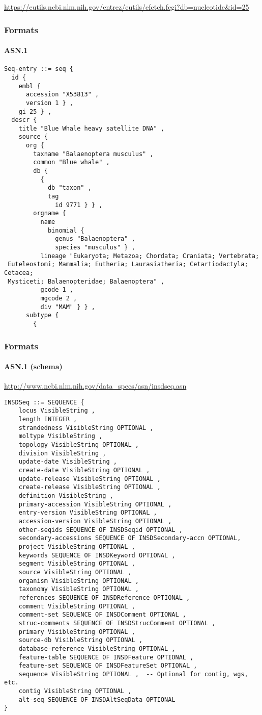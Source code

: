 \documentclass{beamer}
\begin{document}
\begin{frame}[fragile]
\url{https://eutils.ncbi.nlm.nih.gov/entrez/eutils/efetch.fcgi?db=nucleotide&id=25}
\frametitle{Formats}
\framesubtitle{ASN.1}
\begin{lstlisting}[basicstyle=\tiny,breaklines=false]
Seq-entry ::= seq {
  id {
    embl {
      accession "X53813" ,
      version 1 } ,
    gi 25 } ,
  descr {
    title "Blue Whale heavy satellite DNA" ,
    source {
      org {
        taxname "Balaenoptera musculus" ,
        common "Blue whale" ,
        db {
          {
            db "taxon" ,
            tag
              id 9771 } } ,
        orgname {
          name
            binomial {
              genus "Balaenoptera" ,
              species "musculus" } ,
          lineage "Eukaryota; Metazoa; Chordata; Craniata; Vertebrata;
 Euteleostomi; Mammalia; Eutheria; Laurasiatheria; Cetartiodactyla; Cetacea;
 Mysticeti; Balaenopteridae; Balaenoptera" ,
          gcode 1 ,
          mgcode 2 ,
          div "MAM" } } ,
      subtype {
        {
\end{lstlisting}
\end{frame}


\begin{frame}[fragile]
\frametitle{Formats}
\framesubtitle{ASN.1 (schema)}
\url{http://www.ncbi.nlm.nih.gov/data_specs/asn/insdseq.asn}
\begin{lstlisting}[basicstyle=\tiny,breaklines=false]
INSDSeq ::= SEQUENCE {
    locus VisibleString ,
    length INTEGER ,
    strandedness VisibleString OPTIONAL ,
    moltype VisibleString ,
    topology VisibleString OPTIONAL ,
    division VisibleString ,
    update-date VisibleString ,
    create-date VisibleString OPTIONAL ,
    update-release VisibleString OPTIONAL ,
    create-release VisibleString OPTIONAL ,
    definition VisibleString ,
    primary-accession VisibleString OPTIONAL ,
    entry-version VisibleString OPTIONAL ,
    accession-version VisibleString OPTIONAL ,
    other-seqids SEQUENCE OF INSDSeqid OPTIONAL ,
    secondary-accessions SEQUENCE OF INSDSecondary-accn OPTIONAL,
    project VisibleString OPTIONAL ,
    keywords SEQUENCE OF INSDKeyword OPTIONAL ,
    segment VisibleString OPTIONAL ,
    source VisibleString OPTIONAL ,
    organism VisibleString OPTIONAL ,
    taxonomy VisibleString OPTIONAL ,
    references SEQUENCE OF INSDReference OPTIONAL ,
    comment VisibleString OPTIONAL ,
    comment-set SEQUENCE OF INSDComment OPTIONAL ,
    struc-comments SEQUENCE OF INSDStrucComment OPTIONAL ,
    primary VisibleString OPTIONAL ,
    source-db VisibleString OPTIONAL ,
    database-reference VisibleString OPTIONAL ,
    feature-table SEQUENCE OF INSDFeature OPTIONAL ,
    feature-set SEQUENCE OF INSDFeatureSet OPTIONAL ,
    sequence VisibleString OPTIONAL ,  -- Optional for contig, wgs, etc.
    contig VisibleString OPTIONAL ,
    alt-seq SEQUENCE OF INSDAltSeqData OPTIONAL
}
\end{lstlisting}
\end{frame}
\end{document}

